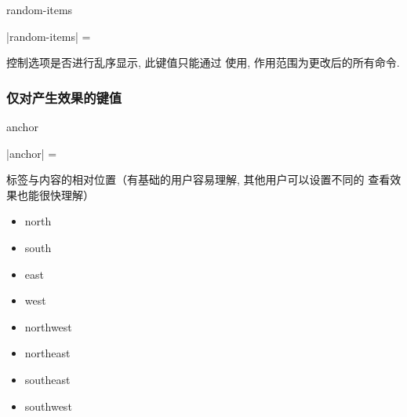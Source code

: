 \documentclass{l3doc}
\begin{document}
\begin{documentation}
\begin{function}[added = 2021-12-25, updated = 2022-01-09]{random-items}
  \begin{syntax}
    |random-items| =  
  \end{syntax}
  控制选项是否进行乱序显示, 此键值只能通过  使用, 作用范围为更改后的所有命令.
\end{function}



\subsubsection{仅对产生效果的键值}
\begin{function}[updated = 2021-12-23]{anchor}
  \begin{syntax}
    |anchor| =  
  \end{syntax}
  标签与内容的相对位置（有基础的用户容易理解, 其他用户可以设置不同的  查看效果也能很快理解）
  \begin{itemize}
    \item north
    \item south
    \item east
    \item west
    \item northwest
    \item northeast
    \item southeast
    \item southwest
  \end{itemize}
\end{function}



\end{documentation}
\end{document}
